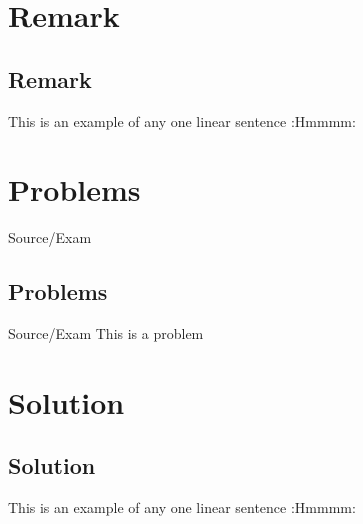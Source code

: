\documentclass[11pt]{scrartcl}
\begin{document}
\section{Remark}
\begin{remark}
\lipsum[1]
\end{remark}


\subsection{Remark}
\begin{remark}
This is an example of any one linear sentence :Hmmmm:
\end{remark}
\newpage


\section{Problems}
\begin{problem}{Source/Exam}
\lipsum[1]
\end{problem}


\subsection{Problems}
\begin{problem}{Source/Exam}
This is a problem 
\end{problem}
\newpage

\section{Solution}
\begin{solution}
\lipsum[1]
\end{solution}


\subsection{Solution}
\begin{solution}
This is an example of any one linear sentence :Hmmmm:
\end{solution}
\end{document}
